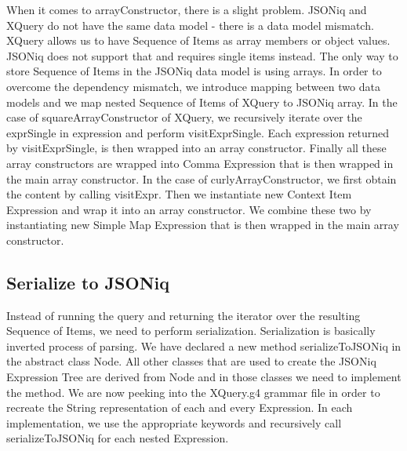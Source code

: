When it comes to arrayConstructor, there is a slight problem. JSONiq and XQuery do not have the same data model - there is a data model mismatch. XQuery allows us to have Sequence of Items as array members or object values. JSONiq does not support that and requires single items instead. The only way to store Sequence of Items in the JSONiq data model is using arrays. In order to overcome the dependency mismatch, we introduce mapping between two data models and we map nested Sequence of Items of XQuery to JSONiq array. In the case of squareArrayConstructor of XQuery, we recursively iterate over the exprSingle in expression and perform visitExprSingle. Each expression returned by visitExprSingle, is then wrapped into an array constructor. Finally all these array constructors are wrapped into Comma Expression that is then wrapped in the main array constructor. In the case of curlyArrayConstructor, we first obtain the content by calling visitExpr. Then we instantiate new Context Item Expression and wrap it into an array constructor. We combine these two by instantiating new Simple Map Expression that is then wrapped in the main array constructor.

\subsection{Serialize to JSONiq}
Instead of running the query and returning the iterator over the resulting Sequence of Items, we need to perform serialization. Serialization is basically inverted process of parsing. We have declared a new method serializeToJSONiq in the abstract class Node. All other classes that are used to create the JSONiq Expression Tree are derived from Node and in those classes we need to implement the method. We are now peeking into the XQuery.g4 grammar file in order to recreate the String representation of each and every Expression. In each implementation, we use the appropriate keywords and recursively call serializeToJSONiq for each nested Expression. 


